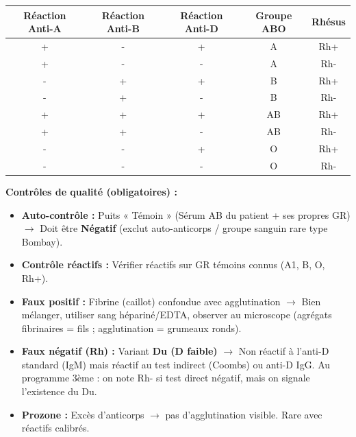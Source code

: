 \documentclass[11pt]{article}
\begin{document}
\begin{center}
\begin{tabular}{|c|c|c|c|c|}
\hline
\rowcolor{popblueL}
\textbf{Réaction Anti-A} & \textbf{Réaction Anti-B} & \textbf{Réaction Anti-D} & \textbf{Groupe ABO} & \textbf{Rhésus} \\
\hline
+ & - & + & A & Rh+ \\
\hline
+ & - & - & A & Rh- \\
\hline
- & + & + & B & Rh+ \\
\hline
- & + & - & B & Rh- \\
\hline
+ & + & + & AB & Rh+ \\
\hline
+ & + & - & AB & Rh- \\
\hline
- & - & + & O & Rh+ \\
\hline
- & - & - & O & Rh- \\
\hline
\end{tabular}
\end{center}

\textbf{Contrôles de qualité (obligatoires) :}
\begin{itemize}
    \item \textbf{Auto-contrôle :} Puits « Témoin » (Sérum AB du patient + ses propres GR) $\rightarrow$ Doit être \textbf{Négatif} (exclut auto-anticorps / groupe sanguin rare type Bombay).
    \item \textbf{Contrôle réactifs :} Vérifier réactifs sur GR témoins connus (A1, B, O, Rh+).
\end{itemize}

\begin{attention}
\begin{itemize}
    \item \textbf{Faux positif :} Fibrine (caillot) confondue avec agglutination $\rightarrow$ Bien mélanger, utiliser sang hépariné/EDTA, observer au microscope (agrégats fibrinaires = fils ; agglutination = grumeaux ronds).
    \item \textbf{Faux négatif (Rh) :} Variant \textbf{Du (D faible)} $\rightarrow$ Non réactif à l'anti-D standard (IgM) mais réactif au test indirect (Coombs) ou anti-D IgG. Au programme 3ème : on note Rh- si test direct négatif, mais on signale l'existence du Du.
    \item \textbf{Prozone :} Excès d'anticorps $\rightarrow$ pas d'agglutination visible. Rare avec réactifs calibrés.
\end{itemize}
\end{attention}
\end{document}
